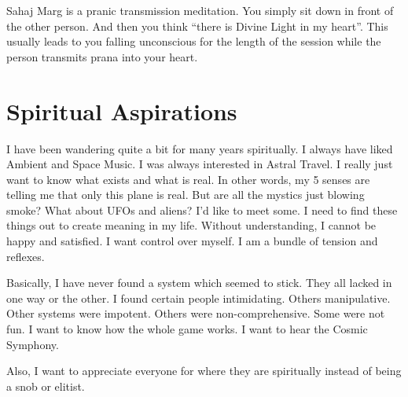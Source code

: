 \documentclass[12pt]{article}%
\begin{document}
Sahaj Marg is a pranic transmission meditation. You simply sit down in front of the other person. And then you think ``there is Divine Light in my heart''. This usually leads to you falling unconscious for the length of the session while the person transmits prana into your heart.

\section{Spiritual Aspirations}
\label{sec:asp}

I have been wandering quite a bit for many years spiritually. I always have liked Ambient and Space Music. I was always interested in Astral Travel. I really just want to know what exists and what is real. In other words, my 5 senses are telling me that only this plane is real. But are all the mystics just blowing smoke? What about UFOs and aliens? I'd like to meet some. I need to find these things out to create meaning in my life. Without understanding, I cannot be happy and satisfied. I want control over myself. I am a bundle of tension and reflexes.

Basically, I have never found a system which seemed to stick. They all lacked in one way or the other. I found certain people intimidating. Others manipulative. Other systems were impotent. Others were non-comprehensive. Some were not fun. I want to know how the whole game works. I want to hear the Cosmic Symphony.

Also, I want to appreciate everyone for where they are spiritually instead of being a snob or elitist.
\end{document}

